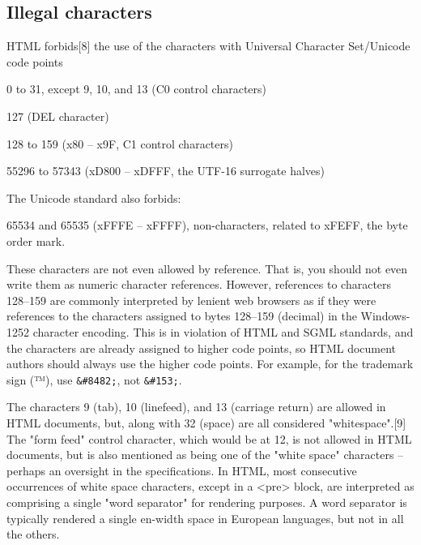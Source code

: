 \subsection{Illegal characters}

HTML forbids[8] the use of the characters with Universal Character Set/Unicode code points

\begin{compactitem}
\item 0 to 31, except 9, 10, and 13 (C0 control characters)
\item 127 (DEL character)
\item 128 to 159 (x80 – x9F, C1 control characters)
\item 55296 to 57343 (xD800 – xDFFF, the UTF-16 surrogate halves)
\end{compactitem}

The Unicode standard also forbids:

\begin{compactitem}
\item 65534 and 65535 (xFFFE – xFFFF), non-characters, related to xFEFF, the byte order mark.
\end{compactitem}

These characters are not even allowed by reference. That is, you should not even write them as numeric character references. However, references to characters 128–159 are commonly interpreted by lenient web browsers as if they were references to the characters assigned to bytes 128–159 (decimal) in the Windows-1252 character encoding. This is in violation of HTML and SGML standards, and the characters are already assigned to higher code points, so HTML document authors should always use the higher code points. For example, for the trademark sign (™), use \texttt{\&\#8482;}, not \texttt{\&\#153;}.

The characters 9 (tab), 10 (linefeed), and 13 (carriage return) are allowed in HTML documents, but, along with 32 (space) are all considered "whitespace".[9] The "form feed" control character, which would be at 12, is not allowed in HTML documents, but is also mentioned as being one of the "white space" characters – perhaps an oversight in the specifications. In HTML, most consecutive occurrences of white space characters, except in a <pre> block, are interpreted as comprising a single "word separator" for rendering purposes. A word separator is typically rendered a single en-width space in European languages, but not in all the others.








